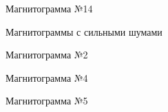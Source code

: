 \documentclass[a4paper,article,14pt]{extarticle}
\begin{document}
\begin{figure}[h!]
\begin{minipage}[h]{0.9\linewidth}
    \end{minipage}
    \vfill
    \begin{minipage}[h]{0.9\linewidth}
     Магнитограмма №14 \\
    \end{minipage}
    \caption{Магнитограммы с сильными шумами}
    \label{image5}
\end{figure}

\pagebreak

\begin{figure}[h!]
    \begin{minipage}[h]{0.9\linewidth}
     Магнитограмма №2 \\
    \end{minipage}
    \vfill
    \begin{minipage}[h]{0.9\linewidth}
     Магнитограмма №4 \\
    \end{minipage}
    \vfill
    \begin{minipage}[h]{0.9\linewidth}
     Магнитограмма №5 \\

\end{minipage}
\end{figure}
\end{document}

